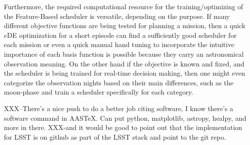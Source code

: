\documentclass[12pt]{aastex62}
\theoremstyle{definition}
\begin{document}
Furthermore, the required computational resource for the training/optimizing of the Feature-Based scheduler is versatile, depending on the purpose. If many different objective functions are being tested for planning a mission, then a quick $e$DE optimization for a short episode can find a sufficiently good scheduler for each mission or even a quick manual hand tuning to incorporate the intuitive importance of each basis function is possible because they carry an astronomical observation meaning. On the other hand if the objective is known and fixed, and the scheduler is being trained for real-time decision making, then one might even categorize the observation nights based on their main differences, such as the moon-phase and train a scheduler specifically for each category. 




XXX--There's a nice push to do a better job citing software, I know there's a software command in AASTeX. Can put python, matplotlib, astropy, healpy, and more in there.
XXX-and it would be good to point out that the implementation for LSST is on github as part of the LSST stack and point to the git repo.


%
%

\end{document}
